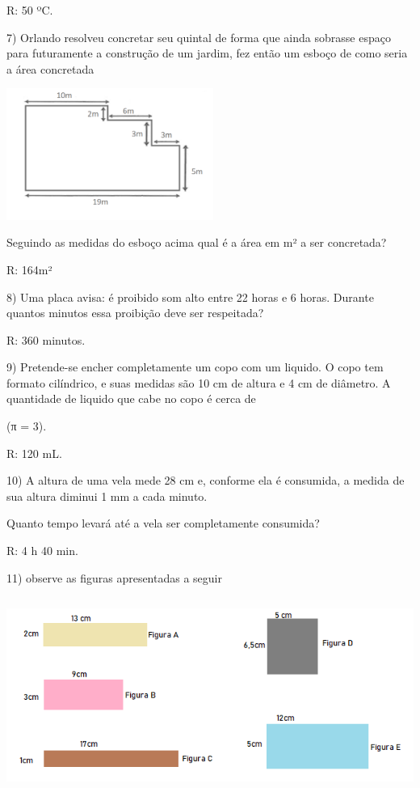 R: 50 ºC.

7) Orlando resolveu concretar seu quintal de forma que ainda sobrasse
espaço para futuramente a construção de um jardim, fez então um esboço
de como seria a área concretada

\includegraphics[width=2.66667in,height=1.6914in]{./imgSAEB_6_MAT/media/image97.png}

Seguindo as medidas do esboço acima qual é a área em m² a ser
concretada?

R: 164m²

8) Uma placa avisa: é proibido som alto entre 22 horas e 6 horas.
Durante quantos minutos essa proibição deve ser respeitada?

R: 360 minutos.

9) Pretende-se encher completamente um copo com um liquido. O copo tem
formato cilíndrico, e suas medidas são 10 cm de altura e 4 cm de
diâmetro. A quantidade de liquido que cabe no copo é cerca de

(π = 3).

R: 120 mL.

10) A altura de uma vela mede 28 cm e, conforme ela é consumida, a
medida de sua altura diminui 1 mm a cada minuto.

Quanto tempo levará até a vela ser completamente consumida?

R: 4 h 40 min.

11) observe as figuras apresentadas a seguir

\includegraphics[width=5.90625in,height=2.51042in]{./imgSAEB_6_MAT/media/image98.png}


